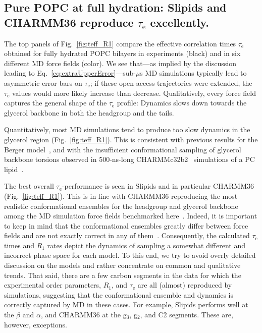 \documentclass[journal=jcisd8,manuscript=article,layout=twocolumn]{achemso}
\begin{document}
\subsection*{Pure POPC at full hydration: Slipids and CHARMM36 reproduce $\tau_\mathrm e$ excellently.}
The top panels of Fig.~\ref{fig:teff_R1} compare the effective correlation times $\tau_\mathrm{e}$ obtained for fully hydrated POPC bilayers in experiments (black) and in six different MD force fields (color).
We see that---as implied by the discussion leading to Eq.~\eqref{eq:extraUpperError}---sub-$\mu$s MD simulations typically lead to asymmetric error bars on $\tau_\mathrm{e}$;
if these open-access trajectories were extended,
the $\tau_\mathrm{e}$ values would more likely increase than decrease.
Qualitatively, every force field captures the general shape of the $\tau_\mathrm{e}$ profile: Dynamics slows down towards the glycerol backbone in both the headgroup and the tails.

Quantitatively, most MD simulations tend to produce too slow dynamics in the glycerol region (Fig.~\ref{fig:teff_R1}).
This %
is consistent with previous results for the Berger model~\cite{ferreira15}, and with the
insufficient conformational sampling of glycerol backbone torsions observed in 500-ns-long CHARMM\-c32b2~\cite{schlenkrich96,feller00} simulations of a PC lipid~\cite{vogel12}. %

The best overall $\tau_\mathrm{e}$-performance is seen in
Slipids and in particular CHARMM36 (Fig.~\ref{fig:teff_R1}). %
%
This is in line with CHARMM36 reproducing the most realistic conformational ensembles
for the headgroup and glycerol backbone among the MD simulation force fields benchmarked here~\cite{botan15,Antila:2019a}.
%
Indeed, it is important to keep in mind that the conformational ensembles %
greatly differ between  force fields and are not exactly correct in any of them~\cite{botan15,Antila:2019a}.
Consequently, the calculated $\tau_\mathrm{e}$ times and $R_1$ rates
depict the dynamics of sampling a somewhat different and incorrect phase space
for each model. %
To this end, we try to avoid overly detailed discussion on the models and rather concentrate on common and qualitative trends.
That said,
there are a few carbon segments in the data for which
the experimental order parameters, $R_1$, and $\tau_\mathrm{e}$ are all (almost) reproduced by simulations,
suggesting that the conformational ensemble and dynamics is correctly captured by MD in these cases. 
For example, 
Slipids performs well at the $\beta$ and $\alpha$, and
CHARMM36 at the g$_3$, g$_2$,  and C2 segments. %
These are, however, exceptions.
\end{document}
